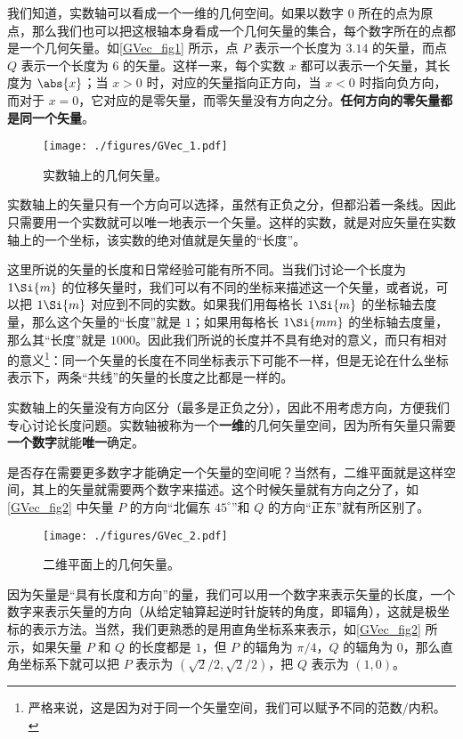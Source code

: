 我们知道，实数轴可以看成一个一维的几何空间。如果以数字 $0$ 所在的点为原点，那么我们也可以把这根轴本身看成一个几何矢量的集合，每个数字所在的点都是一个几何矢量。如\autoref{GVec_fig1} 所示，点 $P$ 表示一个长度为 $3.14$ 的矢量，而点 $Q$ 表示一个长度为 $6$ 的矢量。这样一来，每个实数 $x$ 都可以表示一个矢量，其长度为 $\abs{x}$；当 $x>0$ 时，对应的矢量指向正方向，当 $x<0$ 时指向负方向，而对于 $x=0$，它对应的是零矢量，而零矢量没有方向之分。\textbf{任何方向的零矢量都是同一个矢量}。

\begin{figure}[ht]
\centering
\texttt{[image: ./figures/GVec\_1.pdf]}
\caption{实数轴上的几何矢量。} \label{GVec_fig1}
\end{figure}

实数轴上的矢量只有一个方向可以选择，虽然有正负之分，但都沿着一条线。因此只需要用一个实数就可以唯一地表示一个矢量。这样的实数，就是对应矢量在实数轴上的一个坐标，该实数的绝对值就是矢量的“长度”。


这里所说的矢量的长度和日常经验可能有所不同。当我们讨论一个长度为 $1\Si{m}$ 的位移矢量时，我们可以有不同的坐标来描述这一个矢量，或者说，可以把 $1\Si{m}$ 对应到不同的实数。如果我们用每格长 $1\Si{m}$ 的坐标轴去度量，那么这个矢量的“长度”就是 $1$；如果用每格长 $1\Si{mm}$ 的坐标轴去度量，那么其“长度”就是 $1000$。因此我们所说的长度并不具有绝对的意义，而只有相对的意义\footnote{严格来说，这是因为对于同一个矢量空间，我们可以赋予不同的范数/内积。}：同一个矢量的长度在不同坐标表示下可能不一样，但是无论在什么坐标表示下，两条“共线”的矢量的长度之比都是一样的。


实数轴上的矢量没有方向区分（最多是正负之分），因此不用考虑方向，方便我们专心讨论长度问题。实数轴被称为一个\textbf{一维}的几何矢量空间，因为所有矢量只需要\textbf{一个数字}就能\textbf{唯一}确定。

是否存在需要更多数字才能确定一个矢量的空间呢？当然有，二维平面就是这样空间，其上的矢量就需要两个数字来描述。这个时候矢量就有方向之分了，如\autoref{GVec_fig2} 中矢量 $P$ 的方向“北偏东 $45^\circ$”和 $Q$ 的方向“正东”就有所区别了。

\begin{figure}[ht]
\centering
\texttt{[image: ./figures/GVec\_2.pdf]}
\caption{二维平面上的几何矢量。} \label{GVec_fig2}
\end{figure}

因为矢量是“具有长度和方向”的量，我们可以用一个数字来表示矢量的长度，一个数字来表示矢量的方向（从给定轴算起逆时针旋转的角度，即辐角），这就是极坐标的表示方法。当然，我们更熟悉的是用直角坐标系来表示，如\autoref{GVec_fig2} 所示，如果矢量 $P$ 和 $Q$ 的长度都是 $1$，但 $P$ 的辐角为 $\pi/4$，$Q$ 的辐角为 $0$，那么直角坐标系下就可以把 $P$ 表示为 $(\sqrt{2}/2, \sqrt{2}/2)$，把 $Q$ 表示为 $(1, 0)$。

